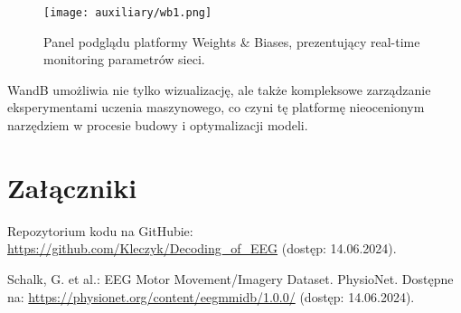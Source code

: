 \documentclass[12pt,twoside]{article}
\begin{document}
\begin{figure}[ht]
    \centering
    \texttt{[image: auxiliary/wb1.png]}
    \caption{Panel podglądu platformy Weights \& Biases, prezentujący real-time monitoring parametrów sieci.}
    \label{fig:wandb_dashboard}
\end{figure}

WandB umożliwia nie tylko wizualizację, ale także kompleksowe zarządzanie eksperymentami uczenia maszynowego, co czyni tę platformę nieocenionym narzędziem w procesie budowy i optymalizacji modeli.
\clearpage

\section*{Załączniki}
Repozytorium kodu na GitHubie: 
\url{https://github.com/Kleczyk/Decoding_of_EEG} (dostęp: 14.06.2024).

\clearpage


\begin{thebibliography}{99}

	 Schalk, G. et al.: EEG Motor Movement/Imagery Dataset. PhysioNet. Dostępne na: \url{https://physionet.org/content/eegmmidb/1.0.0/} (dostęp: 14.06.2024).
\end{thebibliography}


\clearpage
\end{document}
